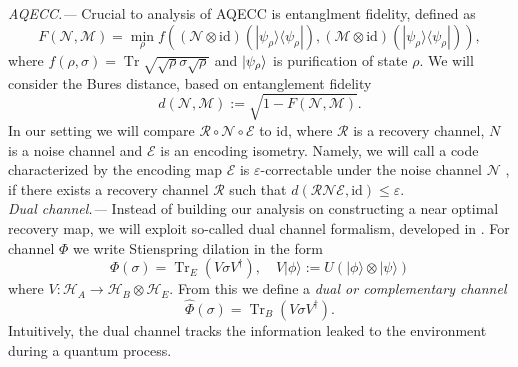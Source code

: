 \documentclass[twocolumn,superscriptaddress,aps,showpacs,amsmath,amstex,amssymb,citeautoscript,floatfix,pra,preprintnumbers]{revtex4-2}
\theoremstyle{plain}
\theoremstyle{plain}
\theoremstyle{plain}
\theoremstyle{plain}
\theoremstyle{plain}
\theoremstyle{plain}
\begin{document}
\textit{AQECC.---} Crucial to analysis of AQECC is entanglment fidelity, defined as   
\[
    F(\mathcal{N}, \mathcal{M})=\min _\rho f((\mathcal{N} \otimes \mathrm{id})(|\psi_{\rho}\rangle\langle\psi_{\rho}|),(\mathcal{M} \otimes \mathrm{id})(|\psi_{\rho}\rangle\langle\psi_{\rho}|)),
\]
where $f(\rho, \sigma)=\operatorname{Tr} \sqrt{\sqrt{\rho} \sigma \sqrt{\rho}}$ and $\ket{\psi_{\rho}}$ is purification of state $\rho$. We will consider the Bures distance, based on entanglement fidelity
\[
    d(\mathcal{N}, \mathcal{M}):=\sqrt{1-F(\mathcal{N}, \mathcal{M})}.
\]
In our setting we will compare $\mathcal{R}\circ\mathcal{N}\circ\mathcal{E}$ to $\mathrm{id}$, where $\mathcal{R}$ is a recovery channel, $N$ is a noise channel and $\mathcal{E}$ is an encoding isometry.
Namely, we will call a code characterized by the encoding map $\mathcal{E}$ is $\varepsilon$-correctable under the noise channel $\mathcal{N}$ \cite{Beny2010}, if there exists a recovery channel $\mathcal{R}$ such that $d(\mathcal{R} \mathcal{N} \mathcal{E}, \mathrm{id}) \leq \varepsilon$.\\
\textit{Dual channel.---} Instead of building our analysis on constructing a near optimal recovery map, we will exploit so-called dual channel formalism, developed in \cite{Beny2010}. For channel $\Phi$ we write Stienspring dilation in the form
\[
    \Phi(\sigma)=\operatorname{Tr}_E\left(V \sigma V^{\dagger}\right), \quad V|\phi\rangle:=U(|\phi\rangle \otimes|\psi\rangle)
\]
where $V: \mathcal{H}_A \rightarrow \mathcal{H}_B \otimes \mathcal{H}_E$. From this we define a \textit{dual or complementary channel}
\[
    \widehat{\Phi}(\sigma)=\operatorname{Tr}_B\left(V \sigma V^{\dagger}\right).
\]
Intuitively, the dual channel tracks the information leaked to the environment during a quantum process.
\end{document}
